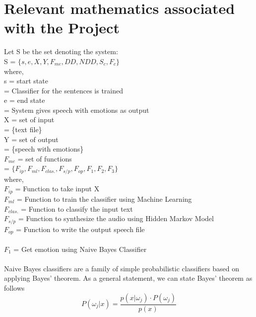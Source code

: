 \documentclass[oneside,a4paper,12pt]{book}
\begin{document}
\section{Relevant mathematics associated with the Project}
\label{sec:math}
Let S be the set denoting the system:\\
S = $\{ s, e, X, Y, F_{me}, DD, NDD, S_{c}, F_{c} \}$\\
where,\\
s = start state\\
\hspace*{5pt}  = Classifier for the sentences is trained\\
e = end state\\
\hspace*{5pt}  = System gives speech with emotions as output\\
X = set of input\\
\hspace*{5pt}  = \{text file\}\\
Y = set of output\\
\hspace*{5pt} = \{speech with emotions\}\\
$F_{me}$ = set of functions\\
\hspace*{5pt} = $\{F_{ip}, F_{ml}, F_{clas.}, F_{s/p}, F_{op}, F_{1}, F_{2}, F_{3}\}$\\
where,\\
$F_{ip}$ = Function to take input X\\
$F_{ml}$ = Function to train the classifier using Machine Learning\\
$F_{clas.}$ = Function to classify the input text\\
$F_{s/p}$ = Function to synthesize the audio using Hidden Markov Model\\
$F_{op}$ = Function to write the output speech file\\\\
$F_{1}$ = Get emotion using Naive Bayes Classifier\\
\\Naive Bayes classifiers are a family of simple probabilistic classifiers based on applying Bayes' theorem.
As a general statement, we can state Bayes' theorem as follows\\

\begin{equation}
\label{eq:bayes}
P(\omega_j|x) = \frac{p(x|\omega_j) \cdot P(\omega_j)}{p(x)}
\end{equation}\\
\end{document}
